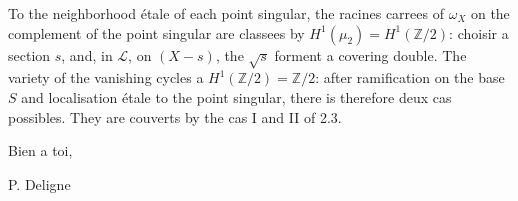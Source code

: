 \documentclass[11pt,a4paper]{article}
\theoremstyle{plain}
\theoremstyle{definition}
\begin{document}
To the neighborhood étale of each point singular, the racines carrees of $\omega_X$ on the complement of the point singular are classees by $H^1(\mu_2) = H^1(\mathbb{Z}/2)$: choisir a section $s$, and, in $\mathcal{L}$, on $(X-s)$, the $\sqrt{s}$ forment a covering double. The variety of the vanishing cycles a $H^1(\mathbb{Z}/2) = \mathbb{Z}/2$: after ramification on the base $S$ and localisation étale to the point singular, there is therefore deux cas possibles. They are couverts by the cas I and II of 2.3.

\vspace{1cm}

\begin{flushright}
Bien a toi,

\vspace{0.5cm}

P. Deligne
\end{flushright}
\end{document}
